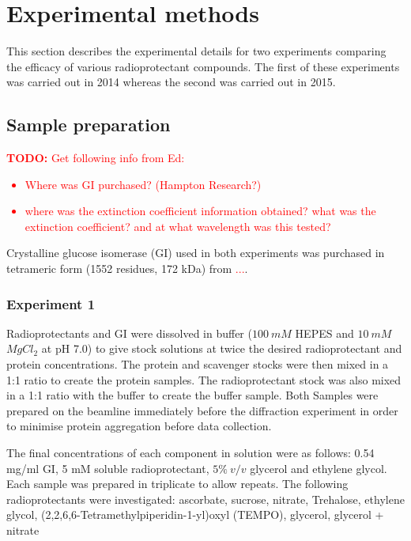 \section{Experimental methods}
\label{sec:Experimental methods}
This section describes the experimental details for two experiments comparing the efficacy of various radioprotectant compounds. The first of these experiments was carried out in 2014 whereas the second was carried out in 2015.

\subsection{Sample preparation}
\label{sub:Sample preparation}
\textcolor{red}{
    \begin{myenumerate}
        \item \hypertarget{todo:Need info from Ed}{\textbf{TODO:} Get following info from Ed:}
        \begin{itemize}
            \item Where was GI purchased? (Hampton Research?)
            \item where was the extinction coefficient information obtained? what was the extinction coefficient? and at what wavelength was this tested?
        \end{itemize}
    \end{myenumerate}
}
Crystalline glucose isomerase (GI) used in both experiments was purchased in tetrameric form (1552 residues, 172 kDa) from \textcolor{red}{...}.

\subsubsection{Experiment 1}
\label{subs:Experiment 1 - sample prep}
Radioprotectants and GI were dissolved in buffer ($100\ mM$ HEPES and $10\ mM$ $MgCl_2$ at pH 7.0) to give stock solutions at twice the desired radioprotectant and protein concentrations. The protein and scavenger stocks were then mixed in a 1:1 ratio to create the protein samples. The radioprotectant stock was also mixed in a 1:1 ratio with the buffer to create the buffer sample. Both Samples were prepared on the beamline immediately before the diffraction experiment in order to minimise protein aggregation before data collection.

The final concentrations of each component in solution were as follows:
0.54 mg/ml GI, 5 mM soluble radioprotectant, $5\%\ v/v$ glycerol and ethylene glycol.
Each sample was prepared in triplicate to allow repeats. The following radioprotectants were investigated: ascorbate, sucrose, nitrate, Trehalose, ethylene glycol, (2,2,6,6-Tetramethylpiperidin-1-yl)oxyl (TEMPO), glycerol, glycerol + nitrate

